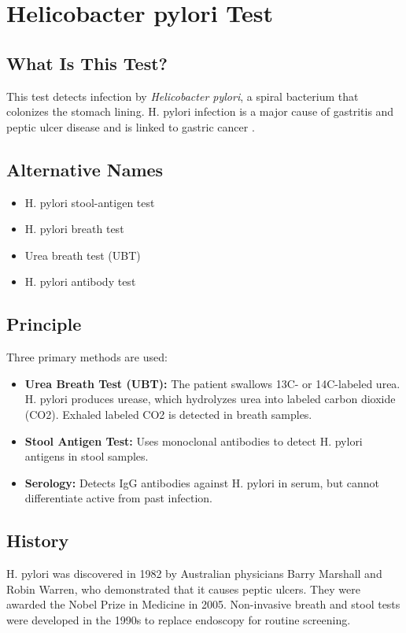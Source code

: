 \chapter{Helicobacter pylori Test}

\section*{What Is This Test?}
This test detects infection by \textit{Helicobacter pylori}, a spiral bacterium that colonizes the stomach lining. H. pylori infection is a major cause of gastritis and peptic ulcer disease and is linked to gastric cancer \cite{crowe2019helicobacter}.

\section*{Alternative Names}
\begin{itemize}
  \item H. pylori stool-antigen test
  \item H. pylori breath test
  \item Urea breath test (UBT)
  \item H. pylori antibody test
\end{itemize}

\section*{Principle}
Three primary methods are used:
\begin{itemize}
    \item \textbf{Urea Breath Test (UBT):} The patient swallows 13C- or 14C-labeled urea. H. pylori produces urease, which hydrolyzes urea into labeled carbon dioxide (CO2). Exhaled labeled CO2 is detected in breath samples.
    \item \textbf{Stool Antigen Test:} Uses monoclonal antibodies to detect H. pylori antigens in stool samples.
    \item \textbf{Serology:} Detects IgG antibodies against H. pylori in serum, but cannot differentiate active from past infection.
\end{itemize}

\section*{History}
H. pylori was discovered in 1982 by Australian physicians Barry Marshall and Robin Warren, who demonstrated that it causes peptic ulcers. They were awarded the Nobel Prize in Medicine in 2005. Non-invasive breath and stool tests were developed in the 1990s to replace endoscopy for routine screening.

